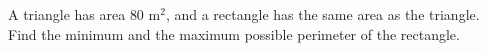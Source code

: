 A triangle has area $80\text{ m}^2$, and a rectangle has the same area as the triangle. Find the minimum and the maximum possible perimeter of the rectangle.
